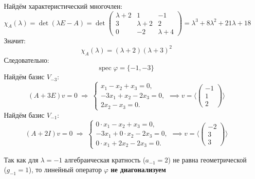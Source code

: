 \documentclass[a4paper]{article}
\renewcommand{\phi}{\varphi}
\begin{document}
\begin{enumerate}
\begin{enumerate}
    \end{enumerate}
    Найдём характеристический многочлен:
    $$
    \chi_A(\lambda)=\det(\lambda E - A)
    =\det\begin{pmatrix}
    \lambda+2 & 1 & -1\\
    3 & \lambda+2 & 2\\
    0 & -2 & \lambda+4
    \end{pmatrix}
    =\lambda^3+8\lambda^2+21\lambda+18
    $$
    Значит:
    $$\chi_A(\lambda)=(\lambda+2)(\lambda+3)^2$$
    Следовательно:
    $$\text{spec}\; \phi = \{-1, -3\}$$
    Найдём базис $V_{-3}$:
    $$
    (A+3E)v=0
    \;\Longrightarrow\;
    \begin{cases}
    x_1 - x_2 + x_3 =0,\\
    -3x_1 + x_2 -2x_3 =0,\\
    2x_2 - x_3 =0.
    \end{cases}
    \implies 
    v=\langle \begin{pmatrix}-1\\1\\2\end{pmatrix} \rangle
    $$
    Найдём базис $V_{-1}$:
    $$
    (A+2I)v=0
    \;\Longrightarrow\;
    \begin{cases}
    0\cdot x_1 - x_2 + x_3 =0,\\
    -3x_1 + 0\cdot x_2 -2x_3 =0,\\
    0\cdot x_1 +2x_2 -2x_3 =0.
    \end{cases} \implies 
    v = \langle \begin{pmatrix}-2\\3\\3\end{pmatrix}\rangle
    $$

    Так как для $\lambda = -1$ алгебраическая кратность ($a_{-1} = 2$) не равна геометрической ($g_{-1} = 1$), то линейный оператор $\phi$ \textbf{не диагонализуем}\\
\end{enumerate}
\end{document}

